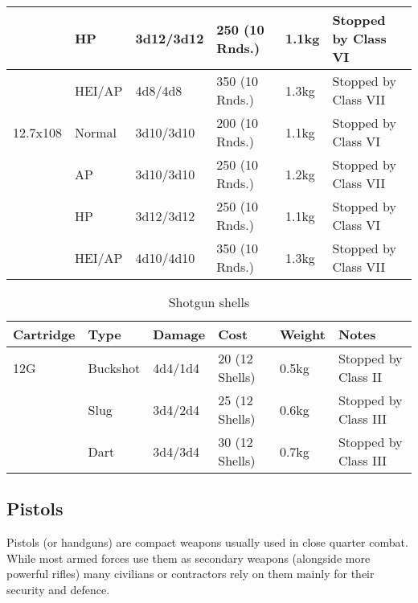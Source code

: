 \begin{table}
\begin{center}
\begin{tabular}{| l | l | l | l | l | l |}
      \,       & HP      & 3d12/3d12  & 250 (10 Rnds.) & 1.1kg & Stopped by Class VI \\ \hline
      \,       & HEI/AP  & 4d8/4d8    & 350 (10 Rnds.) & 1.3kg & Stopped by Class VII \\ \hline
      12.7x108 & Normal  & 3d10/3d10  & 200 (10 Rnds.) & 1.1kg & Stopped by Class VI \\ \hline
      \,       & AP      & 3d10/3d10  & 250 (10 Rnds.) & 1.2kg & Stopped by Class VII \\ \hline
      \,       & HP      & 3d12/3d12  & 250 (10 Rnds.) & 1.1kg & Stopped by Class VI \\ \hline
      \,       & HEI/AP  & 4d10/4d10  & 350 (10 Rnds.) & 1.3kg & Stopped by Class VII \\ \hline

    \end{tabular}
  \end{center}
\end{table}

\begin{table}
  \caption{Shotgun shells}
  \label{tab:ShotgunShells}
  \begin{center}
    \begin{tabular}{| l | l | l | l | l | l |}
      \hline
      \textbf{Cartridge}  & \textbf{Type}   & \textbf{Damage} &
      \textbf{Cost} & \textbf{Weight} & \textbf{Notes}        \\ \hline

      12G     & Buckshot & 4d4/1d4 & 20 (12 Shells) & 0.5kg & Stopped by Class II \\ \hline
      \,      & Slug     & 3d4/2d4 & 25 (12 Shells) & 0.6kg & Stopped by Class III \\ \hline
      \,      & Dart     & 3d4/3d4 & 30 (12 Shells) & 0.7kg & Stopped by Class III \\ \hline

    \end{tabular}
  \end{center}
\end{table}

\subsection{Pistols}
\label{sub:9-Pistols}

Pistols (or handguns) are compact weapons usually used in close quarter combat.
While most armed forces use them as secondary weapons (alongside more powerful
rifles) many civilians or contractors rely on them mainly for their security
and defence.

